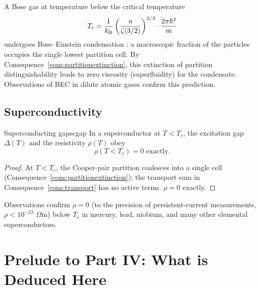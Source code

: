 A Bose gas at temperature below the critical temperature
\begin{equation*}
T_{c}=\frac{1}{k_{\mathrm{B}}}\left(\frac{n}{\zeta(3/2)}\right)^{2/3}\cdot\frac{2\pi\hslash^{2}}{m}
\end{equation*}
undergoes Bose--Einstein condensation \citep{bose1924,andersonetal1995}: a macroscopic fraction of the particles occupies the single lowest partition cell. By Consequence~\ref{cons:partitionextinction}, this extinction of partition distinguishability leads to zero viscosity (superfluidity) for the condensate. Observations of BEC in dilute atomic gases \citep{andersonetal1995} confirm this prediction.

\subsection{Superconductivity}

\begin{consequence}{Superconducting gap}{scgap}
In a superconductor at $T<T_{c}$, the excitation gap $\Delta(T)$ and the resistivity $\rho(T)$ obey
\begin{equation*}
\rho(T<T_{c})=0 \text{ exactly.}
\end{equation*}
\end{consequence}

\begin{proof}
At $T<T_{c}$, the Cooper-pair partition coalesces into a single cell (Consequence~\ref{cons:partitionextinction}); the transport sum in Consequence~\ref{cons:transport} has no active terms. $\rho=0$ exactly.
\end{proof}

Observations \citep{onnes1911} confirm $\rho=0$ (to the precision of persistent-current measurements, $\rho<10^{-23}$ $\Omega$m) below $T_{c}$ in mercury, lead, niobium, and many other elemental superconductors.

\section*{Prelude to Part IV: What is Deduced Here}


